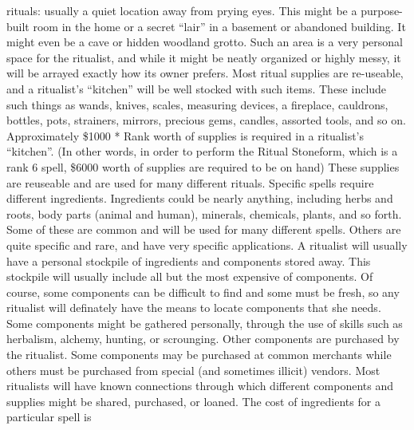 \documentclass[twoside]{book}
\begin{document}
               rituals: usually a quiet location away from prying eyes.
               This might be a purpose-built room in the home or a secret
               “lair” in a basement or abandoned building. It
               might even be a cave or hidden woodland grotto. Such an
               area is a very personal space for the ritualist, and while
               it might be neatly organized or highly messy, it will be
               arrayed exactly how its owner prefers.   Most ritual supplies are re-useable, and a
               ritualist’s “kitchen” will be well
               stocked with such items. These include such things as
               wands, knives, scales, measuring devices, a fireplace,
               cauldrons, bottles, pots, strainers, mirrors, precious
               gems, candles, assorted tools, and so on. Approximately
               \$1000 * Rank worth of supplies is required in a
               ritualist’s “kitchen”. (In other words,
               in order to perform the Ritual Stoneform, which is a rank
               6 spell, \$6000 worth of supplies are required to be on
               hand) These supplies are reuseable and are used for many
               different rituals.   Specific spells require different ingredients.
               Ingredients could be nearly anything, including herbs and
               roots, body parts (animal and human), minerals, chemicals,
               plants, and so forth. Some of these are common and will be
               used for many different spells. Others are quite specific
               and rare, and have very specific applications. A ritualist
               will usually have a personal stockpile of ingredients and
               components stored away. This stockpile will usually
               include all but the most expensive of components. Of
               course, some components can be difficult to find and some
               must be fresh, so any ritualist will definately have the
               means to locate components that she needs. Some components
               might be gathered personally, through the use of skills
               such as herbalism, alchemy, hunting, or scrounging. Other
               components are purchased by the ritualist. Some components
               may be purchased at common merchants while others must be
               purchased from special (and sometimes illicit) vendors.
               Most ritualists will have known connections through which
               different components and supplies might be shared,
               purchased, or loaned.   The cost of ingredients for a particular spell is
\end{document}
